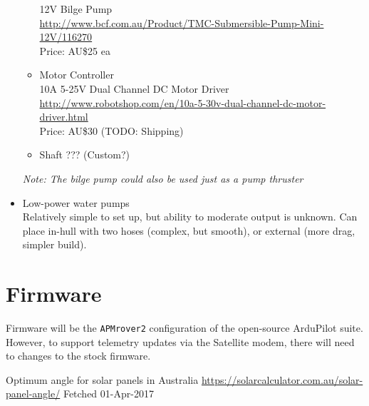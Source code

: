 \begin{itemize}
\begin{itemize}
  12V Bilge Pump \\
  \url{http://www.bcf.com.au/Product/TMC-Submersible-Pump-Mini-12V/116270} \\
  Price: AU\$25 ea
 \item{Motor Controller} \\
  10A 5-25V Dual Channel DC Motor Driver \\
  \url{http://www.robotshop.com/en/10a-5-30v-dual-channel-dc-motor-driver.html}\\
  Price: AU\$30 (TODO: Shipping)
 \item{Shaft} ??? (Custom?)
 \end{itemize}
 \emph{Note: The bilge pump could also be used just as a pump thruster}
\item{Low-power water pumps} \\
 Relatively simple to set up, but ability to moderate output is unknown. Can place in-hull with two hoses (complex, but smooth), or external (more drag, simpler build).
\end{itemize}

\section{Firmware}
Firmware will be the \texttt{APMrover2} configuration of the open-source ArduPilot suite. However, to support telemetry updates via the Satellite modem, there will need to changes to the stock firmware.

\begin{thebibliography}{9}
 Optimum angle for solar panels in Australia
 \url{https://solarcalculator.com.au/solar-panel-angle/}
 Fetched 01-Apr-2017
\end{thebibliography}


